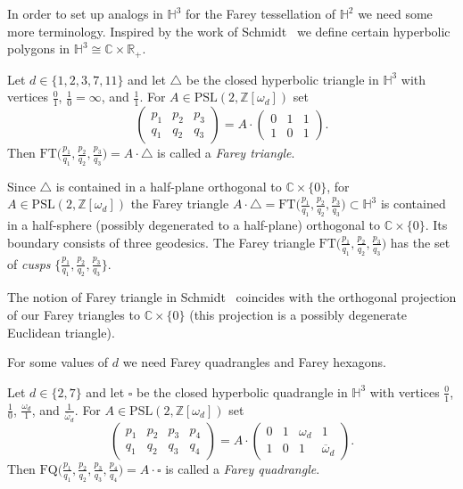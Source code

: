 \documentclass[graybox]{svmult}
\newcommand\FT{\mathrm{FT}}
\newcommand\FQ{\mathrm{FQ}}
\begin{document}
In order to set up analogs in $\mathbb{H}^3$ for the Farey tessellation of $\mathbb{H}^2$ we need some more terminology.  Inspired by the work of Schmidt~\cite{SchmidtAsmus:69,SchmidtAsmus:78} we define certain hyperbolic polygons in $\mathbb{H}^3\cong\mathbb{C}\times\mathbb{R}_+$.

\begin{definition}\label{def:fareytriangle}
Let $d\in\{1,2,3,7,11\}$ and let $\triangle$ be the closed hyperbolic triangle in $\mathbb{H}^3$ with vertices $\frac01$, $\frac10=\infty$, and $\frac11$. For $A \in \mathrm{PSL}(2, \mathbb{Z}[\omega_d])$ set 
\[
\begin{pmatrix} p_1& p_2&p_3 \\ q_1&q_2&q_3\end{pmatrix}=A \cdot \begin{pmatrix} 0&1&1 \\ 1&0&1\end{pmatrix}.
\]
Then $\FT\big(\frac{p_1}{q_1},\frac{p_2}{q_2},\frac{p_3}{q_3}\big)=A\cdot \triangle$ is called a \emph{Farey triangle}.
\end{definition}

Since $\triangle$ is contained in a half-plane orthogonal to $\mathbb{C}\times\{0\}$, for $A \in \mathrm{PSL}(2, \mathbb{Z}[\omega_d])$ the Farey triangle $A\cdot \triangle=\FT\big(\frac{p_1}{q_1},\frac{p_2}{q_2},\frac{p_3}{q_3}\big)\subset\mathbb{H}^3$ is contained in a half-sphere (possibly degenerated to a half-plane) orthogonal to $\mathbb{C}\times\{0\}$. Its boundary consists of three geodesics. The Farey triangle $\FT\big(\frac{p_1}{q_1},\frac{p_2}{q_2},\frac{p_3}{q_3}\big)$ has the set of {\em cusps} $\big\{\frac{p_1}{q_1},\frac{p_2}{q_2},\frac{p_3}{q_3}\big\}$.

The notion of Farey triangle in Schmidt~\cite{SchmidtAsmus:69} coincides with the orthogonal projection of our Farey triangles to $\mathbb{C}\times\{0\}$ (this projection is a possibly degenerate Euclidean triangle). 

For some values of $d$ we need Farey quadrangles and Farey hexagons.

\begin{definition}
Let $d\in\{2, 7\}$ and let $\square$ be the closed hyperbolic quadrangle in $\mathbb{H}^3$ with vertices $\frac01$, $\frac10$, $\frac{\omega_d}1$, and $\frac1{\overline{\omega}_d}$. For $A \in \mathrm{PSL}(2, \mathbb{Z}[\omega_d])$  set 
\[
\begin{pmatrix} p_1& p_2&p_3&p_4 \\ q_1&q_2&q_3&q_4 \end{pmatrix}=A \cdot \begin{pmatrix} 0&1&\omega_d&1 \\ 1&0&1&\overline{\omega}_d\end{pmatrix}.
\]
Then $\FQ\big(\frac{p_1}{q_1},\frac{p_2}{q_2},\frac{p_3}{q_3},\frac{p_4}{q_4}\big)=A\cdot \square$ is called a \emph{Farey quadrangle}.
\end{definition}
\end{document}
